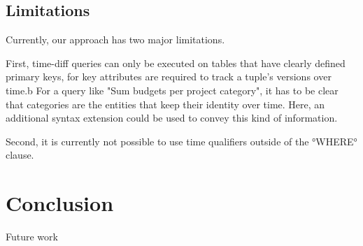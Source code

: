 \documentclass[english]{sig-alternate-05-2015}
\begin{document}
\subsection{Limitations}

Currently, our approach has two major limitations.

First, time-diff queries can only be executed on tables that have clearly defined primary keys, for key attributes are required to track a tuple's versions over time.b
For a query like "Sum budgets per project category", it has to be clear that categories are the entities that keep their identity over time.
Here, an additional syntax extension could be used to convey this kind of information.

Second, it is currently not possible to use time qualifiers outside of the °WHERE° clause.



\section{Conclusion}
\label{sec:conclusion}


Future work

%

\end{document}
